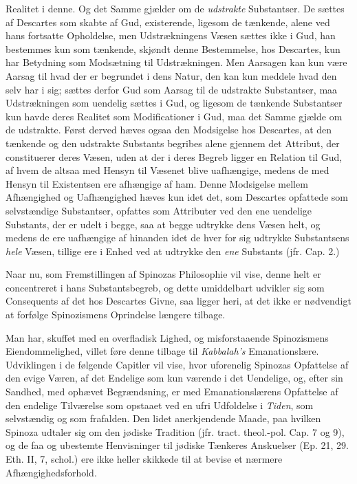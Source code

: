 \documentclass[12pt,a4paper]{book}
\newcommand{\opage}[1]{\marginnote{\footnotesize\textit{[#1]}}}
\begin{document}
Realitet i denne. Og det Samme gjælder om de \emph{udstrakte}
Substantser. De sættes af Descartes
\opage{23} som skabte af Gud, existerende, ligesom de tænkende, alene ved hans
fortsatte Opholdelse, men Udstrækningens Væsen sættes ikke i Gud, han
bestemmes kun som tænkende, skjøndt denne Bestemmelse, hos Descartes, kun
har Betydning som Modsætning til Udstrækningen. Men Aarsagen kan kun være
Aarsag til hvad der er begrundet i dens Natur, den kan kun meddele hvad
den selv har i sig; sættes derfor Gud som Aarsag til de udstrakte
Substantser, maa Udstrækningen som uendelig sættes i Gud, og ligesom de
tænkende Substantser kun havde deres Realitet som Modificationer i Gud,
maa det Samme gjælde om de udstrakte. Først derved hæves ogsaa den
Modsigelse hos Descartes, at den tænkende og den udstrakte Substants
begribes alene gjennem det Attribut, der constituerer deres Væsen, uden
at der i deres Begreb ligger en Relation til Gud, af hvem de altsaa med
Hensyn til Væsenet blive uafhængige, medens de med Hensyn til Existentsen
ere afhængige af ham. Denne Modsigelse mellem Afhængighed og
Uafhængighed hæves kun idet det, som Descartes opfattede som
selvstændige Substantser, opfattes som Attributer ved den ene uendelige
Substants, der er udelt i begge, saa at begge udtrykke dens Væsen helt,
og medens de ere uafhængige af hinanden idet de hver for sig udtrykke
Substantsens \emph{hele} Væsen, tillige ere i Enhed ved at udtrykke den
\emph{ene} Substants (jfr. Cap. 2.)

Naar nu, som Fremstillingen af Spinozas Philosophie vil vise, denne helt
er concentreret i hans Substantsbegreb, og dette umiddelbart udvikler sig
som Consequents af det hos Descartes Givne, saa ligger heri, at det ikke
er nødvendigt at forfølge Spinozismens Oprindelse længere tilbage.

Man har, skuffet med en overfladisk Lighed, og misforstaaende
Spinozismens Eiendommelighed, villet føre denne tilbage til
\emph{Kabbalah's} Emanationslære. Udviklingen i de følgende Capitler vil
vise, hvor uforenelig Spinozas Opfattelse af den evige Væren, af det
Endelige som kun værende i det Uendelige, og, efter sin Sandhed, med
ophævet Begrændsning, er med Emanationslærens Opfattelse af den endelige
Tilværelse som opstaaet ved en ufri Udfoldelse i
\opage{24} \setcounter{footnote}{0}%
\emph{Tiden}, som selvstændig og som frafalden. Den lidet anerkjendende
Maade, paa hvilken Spinoza udtaler sig om den jødiske Tradition (jfr.
tract. theol.-pol. Cap. 7 og 9), og de faa og ubestemte Henvisninger til
jødiske Tænkeres Anskuelser (Ep. 21, 29. Eth. II, 7, schol.) ere ikke
heller skikkede til at bevise et nærmere Afhængighedsforhold.
\end{document}
